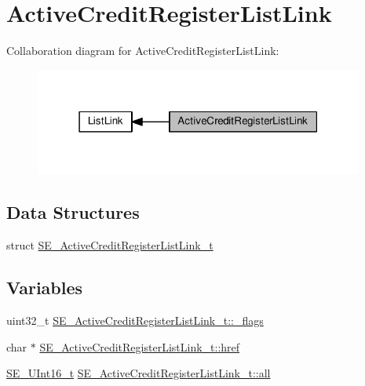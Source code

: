 \hypertarget{group__ActiveCreditRegisterListLink}{}\section{Active\+Credit\+Register\+List\+Link}
\label{group__ActiveCreditRegisterListLink}
Collaboration diagram for Active\+Credit\+Register\+List\+Link\+:\nopagebreak
\begin{figure}[H]
\begin{center}
\leavevmode
\includegraphics[width=307pt]{group__ActiveCreditRegisterListLink}
\end{center}
\end{figure}
\subsection*{Data Structures}
\begin{DoxyCompactItemize}
\item 
struct \hyperlink{structSE__ActiveCreditRegisterListLink__t}{S\+E\+\_\+\+Active\+Credit\+Register\+List\+Link\+\_\+t}
\end{DoxyCompactItemize}
\subsection*{Variables}
\begin{DoxyCompactItemize}
\item 
uint32\+\_\+t \hyperlink{group__ActiveCreditRegisterListLink_gaaf0b3c3b84c47e758967e5856f621999}{S\+E\+\_\+\+Active\+Credit\+Register\+List\+Link\+\_\+t\+::\+\_\+flags}
\item 
char $\ast$ \hyperlink{group__ActiveCreditRegisterListLink_gac685dc27ee8c52ebd780e40cf6d2590c}{S\+E\+\_\+\+Active\+Credit\+Register\+List\+Link\+\_\+t\+::href}
\item 
\hyperlink{group__UInt16_gac68d541f189538bfd30cfaa712d20d29}{S\+E\+\_\+\+U\+Int16\+\_\+t} \hyperlink{group__ActiveCreditRegisterListLink_gaa7913b5cc1a4b61f153a9ee0ab97828c}{S\+E\+\_\+\+Active\+Credit\+Register\+List\+Link\+\_\+t\+::all}
\end{DoxyCompactItemize}



